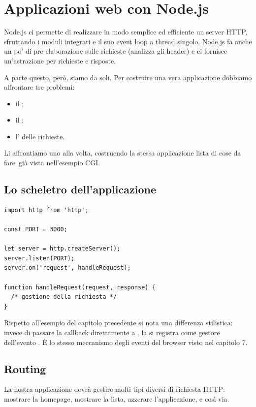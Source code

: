 \chapter{Applicazioni web con Node.js}

Node.js ci permette di realizzare in modo semplice ed efficiente un server HTTP,
sfruttando i moduli integrati e il suo event loop a thread singolo. Node.js fa
anche un po' di pre-elaborazione sulle richieste (analizza gli header) e ci
fornisce un'astrazione per richieste e risposte.

A parte questo, però, siamo da soli. Per costruire una vera applicazione
dobbiamo affrontare tre problemi:

\begin{itemize}
  \item il ;
  \item il ;
  \item l' delle richieste.
\end{itemize}

Li affrontiamo uno alla volta, costruendo la stessa applicazione
\guillemotleft lista di cose da fare\guillemotright\ già vista nell'esempio CGI.

\section{Lo scheletro dell'applicazione}

\begin{lstlisting}[style=js, name=app.js]
import http from 'http';

const PORT = 3000;

let server = http.createServer();
server.listen(PORT);
server.on('request', handleRequest);

function handleRequest(request, response) {
  /* gestione della richiesta */
}
\end{lstlisting}

Rispetto all'esempio del capitolo precedente si nota una differenza stilistica:
invece di passare la callback direttamente a , la si registra
come gestore dell'evento . È lo stesso meccanismo degli eventi
del browser visto nel capitolo 7.

\section{Routing}

La nostra applicazione dovrà gestire molti tipi diversi di richiesta HTTP:
mostrare la homepage, mostrare la lista, azzerare l'applicazione, e così via.


